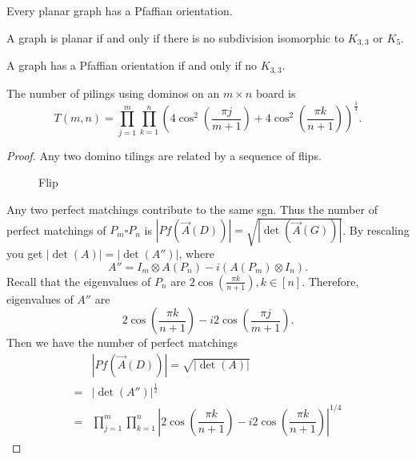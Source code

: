 \begin{theorem}
Every planar graph has a Pfaffian orientation.
\end{theorem}
\begin{theorem}
A graph is planar if and only if there is no subdivision isomorphic to $K_{3,3}$ or $K_5$.
\end{theorem}
\begin{theorem}
A graph has a Pfaffian orientation if and only if no $K_{3,3}$.
\end{theorem}
\begin{theorem}
The number of pilings using dominos on an $m\times n$ board is 
$$T(m,n)=\prod_{j=1}^{m}\prod_{k=1}^n(4\cos^2(\frac{\pi j}{m+1})+4\cos^2(\frac{\pi k}{n+1}))^{\frac{1}{4}}.$$
\end{theorem}
\begin{proof}
Any two domino tilings are related by a sequence of flips.
\begin{figure}[ht!]
\centering
{}
\label{fig:domino_flip}
\caption{Flip}
\end{figure}
Any two perfect matchings contribute to the same sgn. Thus the number of perfect matchings of $P_m\square P_n$ is $|Pf(\vec{A}(D))|=\sqrt{|\det(\vec{A}(G))|}$. By rescaling you get $|\det(A)|=|\det(A'')|$, where 
$$A''=I_m\otimes A(P_n)-i(A(P_m)\otimes I_n).$$
Recall that the eigenvalues of $P_n$ are $2\cos(\frac{\pi k}{n+1}),k\in[n]$. Therefore, eigenvalues of $A''$ are 
$$2\cos(\frac{\pi k}{n+1})-i2\cos(\frac{\pi j}{m+1}).$$
Then we have the number of perfect matchings 
\begin{align*}
&|Pf(\vec{A}(D))|=\sqrt{|\det(A)|}\\
=&|\det(A'')|^{\frac{1}{2}}\\
=&\prod_{j=1}^{m}\prod_{k=1}^n |2\cos(\dfrac{\pi k}{n+1}) - i 2\cos(\dfrac{\pi k}{n+1})|^{1/4}
\end{align*}


\end{proof}

